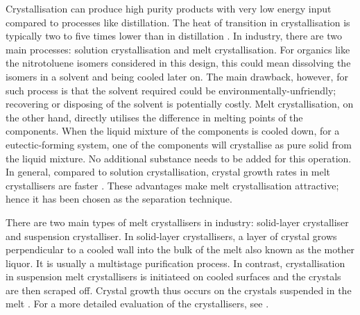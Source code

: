 Crystallisation can produce high purity products with very low energy input compared to processes like distillation. The heat of transition in crystallisation is typically two to five times lower than in distillation \cite{bassett_melt_2021}. In industry, there are two main processes: solution crystallisation and melt crystallisation. For organics like the nitrotoluene isomers considered in this design, this could mean dissolving the isomers in a solvent and being cooled later on. The main drawback, however, for such process is that the solvent required could be environmentally-unfriendly; recovering or disposing of the solvent is potentially costly. Melt crystallisation, on the other hand, directly utilises the difference in melting points of the components. When the liquid mixture of the components is cooled down, for a eutectic-forming system, one of the components will crystallise as pure solid from the liquid mixture. No additional substance needs to be added for this operation. In general, compared to solution crystallisation, crystal growth rates in melt crystallisers are faster \cite{myerson_handbook_2019}. These advantages make melt crystallisation attractive; hence it has been chosen as the separation technique. 


There are two main types of melt crystallisers in industry: solid-layer crystalliser and suspension crystalliser. In solid-layer crystallisers, a layer of crystal grows perpendicular to a cooled wall into the bulk of the melt also known as the mother liquor. It is usually a multistage purification process. In contrast, crystallisation in suspension melt crystallisers is initiateed on cooled surfaces and the crystals are then scraped off. Crystal growth thus occurs on the crystals suspended in the melt \cite{myerson_handbook_2019}. For a more detailed evaluation of the crystallisers, see . 

